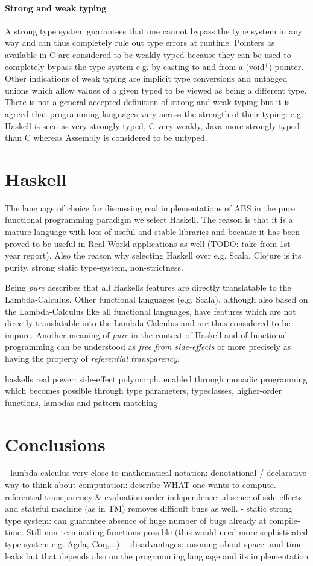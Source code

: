 \paragraph{Strong and weak typing}
A strong type system guarantees that one cannot bypass the type system in any way and can thus completely rule out type errors at runtime. Pointers as available in C are considered to be weakly typed because they can be used to completely bypass the type system e.g. by casting to and from a (void*) pointer. Other indications of weak typing are implicit type conversions and untagged unions which allow values of a given typed to be viewed as being a different type.
There is not a general accepted definition of strong and weak typing but it is agreed that programming languages vary across the strength of their typing: e.g. Haskell is seen as very strongly typed, C very weakly, Java more strongly typed than C whereas Assembly is considered to be untyped.

\section{Haskell}
The language of choice for discussing real implementations of ABS in the pure functional programming paradigm we select Haskell. The reason is that it is a mature language with lots of useful and stable libraries and because it has been proved to be useful in Real-World applications as well (TODO: take from 1st year report). Also the reason why selecting Haskell over e.g. Scala, Clojure is its purity, strong static type-system, non-strictness.

Being \textit{pure} describes that all Haskells features are directly translatable to the Lambda-Calculus. Other functional languages (e.g. Scala), although also based on the Lambda-Calculus like all functional languages, have features which are not directly translatable into the Lambda-Calculus and are thus considered to be impure. Another meaning of \textit{pure} in the context of Haskell and of functional programming can be understood as \textit{free from side-effects} or more precisely as having the property of \textit{referential transparency}. 

haskells real power: side-effect polymorph. enabled through monadic progranming which becomes possible through type parameters, typeclasses, higher-order functions, lambdas and pattern matching

\section{Conclusions}
- lambda calculus very close to mathematical notation: denotational / declarative way to think about computation: describe WHAT one wants to compute.
- referential transparency \& evaluation order independence: absence of side-effects and stateful machine (as in TM) removes difficult bugs as well.
- static strong type system: can guarantee absence of huge number of bugs already at compile-time. Still non-terminating functions possible (this would need more sophisticated type-system e.g. Agda, Coq,...).
- disadvantages: rasoning about space- and time-leaks but that depends also on the programming language and its implementation